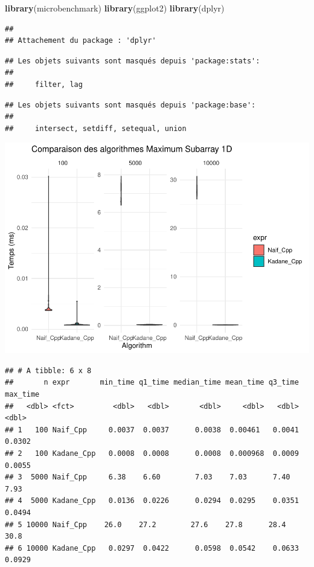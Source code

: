 \documentclass[
]{article}
\newenvironment{Shaded}{\begin{snugshade}}{\end{snugshade}}
\newcommand{\FunctionTok}[1]{\textcolor[rgb]{0.13,0.29,0.53}{\textbf{#1}}}
\newcommand{\NormalTok}[1]{#1}
\begin{document}
\begin{Shaded}
\begin{Highlighting}[]
\FunctionTok{library}\NormalTok{(microbenchmark)}
\FunctionTok{library}\NormalTok{(ggplot2)}
\FunctionTok{library}\NormalTok{(dplyr)}
\end{Highlighting}
\end{Shaded}

\begin{verbatim}
## 
## Attachement du package : 'dplyr'
\end{verbatim}

\begin{verbatim}
## Les objets suivants sont masqués depuis 'package:stats':
## 
##     filter, lag
\end{verbatim}

\begin{verbatim}
## Les objets suivants sont masqués depuis 'package:base':
## 
##     intersect, setdiff, setequal, union
\end{verbatim}

\includegraphics{MaxSubarray1D_files/figure-latex/benchmark-1.pdf}

\begin{verbatim}
## # A tibble: 6 x 8
##       n expr       min_time q1_time median_time mean_time q3_time max_time
##   <dbl> <fct>         <dbl>   <dbl>       <dbl>     <dbl>   <dbl>    <dbl>
## 1   100 Naif_Cpp     0.0037  0.0037      0.0038  0.00461   0.0041   0.0302
## 2   100 Kadane_Cpp   0.0008  0.0008      0.0008  0.000968  0.0009   0.0055
## 3  5000 Naif_Cpp     6.38    6.60        7.03    7.03      7.40     7.93  
## 4  5000 Kadane_Cpp   0.0136  0.0226      0.0294  0.0295    0.0351   0.0494
## 5 10000 Naif_Cpp    26.0    27.2        27.6    27.8      28.4     30.8   
## 6 10000 Kadane_Cpp   0.0297  0.0422      0.0598  0.0542    0.0633   0.0929
\end{verbatim}
\end{document}
